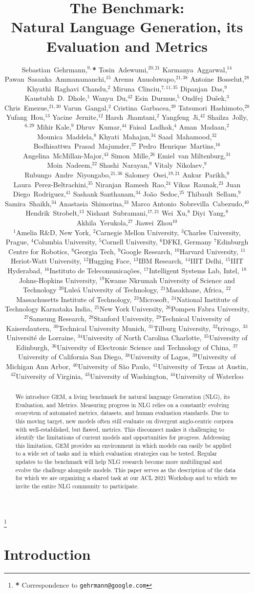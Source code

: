 \documentclass[11pt,a4paper]{article}
\title{The\emojigem\GEM{} Benchmark: \\ Natural Language Generation, its Evaluation and Metrics}
\author{
\begin{minipage}[t]{\textwidth}
\centering
\normalsize
Sebastian~Gehrmann,$^{9,}$\textbf{*}
Tosin~Adewumi,$^{20,21}$
Karmanya~Aggarwal,$^{14}$
Pawan~Sasanka~Ammanamanchi,$^{15}$
Aremu~Anuoluwapo,$^{21,38}$
Antoine~Bosselut,$^{28}$
Khyathi~Raghavi~Chandu,$^{2}$
Miruna~Clinciu,$^{7,11,35}$
Dipanjan~Das,$^{9}$
Kaustubh~D.~Dhole,$^{1}$
Wanyu~Du,$^{42}$
Esin~Durmus,$^{5}$
Ondřej~Dušek,$^{3}$
Chris~Emezue,$^{21,30}$
Varun~Gangal,$^{2}$
Cristina~Garbacea,$^{39}$
Tatsunori~Hashimoto,$^{28}$
Yufang~Hou,$^{13}$
Yacine~Jernite,$^{12}$
Harsh~Jhamtani,$^{2}$
Yangfeng~Ji,$^{42}$
Shailza~Jolly,$^{6,29}$
Mihir Kale,$^{9}$
Dhruv~Kumar,$^{44}$
Faisal~Ladhak,$^{4}$
Aman~Madaan,$^{2}$
Mounica~Maddela,$^{8}$
Khyati~Mahajan,$^{34}$
Saad~Mahamood,$^{32}$
Bodhisattwa~Prasad~Majumder,$^{37}$
Pedro~Henrique~Martins,$^{16}$
Angelina~McMillan-Major,$^{43}$
Simon~Mille,$^{26}$
Emiel~van Miltenburg,$^{31}$
Moin~Nadeem,$^{22}$
Shashi~Narayan,$^{9}$
Vitaly~Nikolaev,$^{9}$
Rubungo~Andre~Niyongabo,$^{21,36}$
Salomey~Osei,$^{19,21}$
Ankur~Parikh,$^{9}$
Laura~Perez-Beltrachini,$^{35}$
Niranjan~Ramesh~Rao,$^{24}$
Vikas~Raunak,$^{23}$
Juan Diego~Rodriguez,$^{41}$
Sashank Santhanam,$^{34}$
João~Sedoc,$^{25}$
Thibault~Sellam,$^{9}$
Samira~Shaikh,$^{34}$
Anastasia~Shimorina,$^{33}$
Marco Antonio~Sobrevilla~Cabezudo,$^{40}$
Hendrik~Strobelt,$^{13}$
Nishant~Subramani,$^{17,21}$
Wei~Xu,$^{8}$
Diyi~Yang,$^{8}$
Akhila~Yerukola,$^{27}$
Jiawei~Zhou$^{10}$ \\

{\footnotesize \normalfont 
$^{1}$Amelia R\&D, New York,
$^{2}$Carnegie Mellon University,
$^{3}$Charles University, Prague,
$^{4}$Columbia University,
$^{5}$Cornell University,
$^{6}$DFKI, Germany
$^{7}$Edinburgh Centre for Robotics,
$^{8}$Georgia Tech,
$^{9}$Google Research,
$^{10}$Harvard University,
$^{11}$Heriot-Watt University,
$^{12}$Hugging Face,
$^{13}$IBM Research,
$^{14}$IIIT Delhi,
$^{15}$IIIT Hyderabad,
$^{16}$Instituto de Telecomunicações,
$^{17}$Intelligent Systems Lab, Intel,
$^{18}$Johns-Hopkins University,
$^{19}$Kwame Nkrumah University of Science and Technology
$^{20}$Luleå University of Technology,
$^{21}$Masakhane, Africa,
$^{22}$Massachusetts Institute of Technology,
$^{23}$Microsoft,
$^{24}$National Institute of Technology Karnataka India,
$^{25}$New York University,
$^{26}$Pompeu Fabra University,
$^{27}$Samsung Research,
$^{28}$Stanford University,
$^{29}$Technical University of Kaiserslautern,
$^{30}$Technical University Munich,
$^{31}$Tilburg University,
$^{32}$trivago,
$^{33}$Université de Lorraine,
$^{34}$University of North Carolina Charlotte,
$^{35}$University of Edinburgh,
$^{36}$University of Electronic Science and Technology of China,
$^{37}$University of California San Diego,
$^{38}$University of Lagos,
$^{39}$University of Michigan Ann Arbor,
$^{40}$University of São Paulo,
$^{41}$University of Texas at Austin,
$^{42}$University of Virginia,
$^{43}$University of Washington,
$^{44}$University of Waterloo
} 
\end{minipage}
}
\date{}
\newcommand\blfootnote[1]{\begingroup
  \renewcommand\thefootnote{}\footnote{#1}\addtocounter{footnote}{-1}\endgroup
}
\newcommand{\GEM}{\textsc{GEM}}
\begin{document}
\maketitle
\blfootnote{\textbf{*} Correspondence to \texttt{gehrmann@google.com}}
\begin{abstract}
    We introduce \GEM, a living benchmark for natural language Generation (NLG), its Evaluation, and Metrics. 
    Measuring progress in NLG relies on a constantly evolving ecosystem of automated metrics, datasets, and human evaluation standards. 
    Due to this moving target, new models often still evaluate on divergent anglo-centric corpora with well-established, but flawed, metrics. 
    This disconnect makes it challenging to identify the limitations of current models and opportunities for progress.
    Addressing this limitation, \GEM{} provides an environment in which models can easily be applied to a wide set of tasks and in which evaluation strategies can be tested. 
    Regular updates to the benchmark will help NLG research become more multilingual and evolve the challenge alongside models. 
    This paper serves as the description of the data for which we are organizing a shared task at our ACL 2021 Workshop and to which we invite the entire NLG community to participate. 
\end{abstract}


\section{Introduction}
\end{document}
